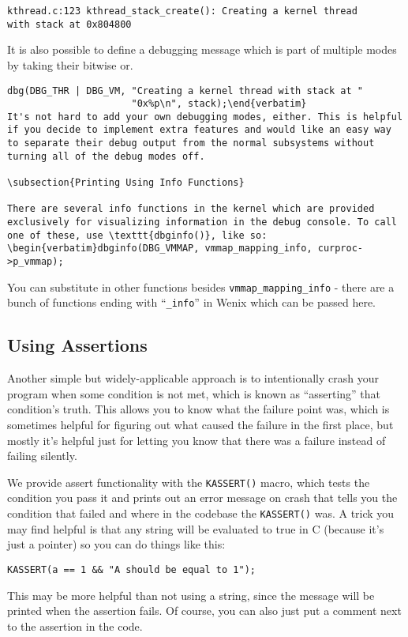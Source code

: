 \begin{verbatim}
kthread.c:123 kthread_stack_create(): Creating a kernel thread
with stack at 0x804800\end{verbatim}
It is also possible to define a debugging message which is part of multiple modes by taking their bitwise or.
\begin{verbatim}
dbg(DBG_THR | DBG_VM, "Creating a kernel thread with stack at "
                      "0x%p\n", stack);\end{verbatim}
It's not hard to add your own debugging modes, either. This is helpful if you decide to implement extra features and would like an easy way to separate their debug output from the normal subsystems without turning all of the debug modes off.

\subsection{Printing Using Info Functions}

There are several info functions in the kernel which are provided exclusively for visualizing information in the debug console. To call one of these, use \texttt{dbginfo()}, like so:
\begin{verbatim}dbginfo(DBG_VMMAP, vmmap_mapping_info, curproc->p_vmmap);\end{verbatim}
You can substitute in other functions besides \texttt{vmmap\_mapping\_info} - there are a bunch of functions ending with ``\texttt{\_info}'' in Wenix which can be passed here.

\subsection{Using Assertions}

Another simple but widely-applicable approach is to intentionally crash your program when some condition is not met, which is known as ``asserting'' that condition's truth. This allows you to know what the failure point was, which is sometimes helpful for figuring out what caused the failure in the first place, but mostly it's helpful just for letting you know that there was a failure instead of failing silently.

We provide assert functionality with the \texttt{KASSERT()} macro, which tests the condition you pass it and prints out an error message on crash that tells you the condition that failed and where in the codebase the \texttt{KASSERT()} was. A trick you may find helpful is that any string will be evaluated to true in C (because it's just a pointer) so you can do things like this:
\begin{verbatim}
KASSERT(a == 1 && "A should be equal to 1");\end{verbatim}
This may be more helpful than not using a string, since the message will be printed when the assertion fails. Of course, you can also just put a comment next to the assertion in the code.

